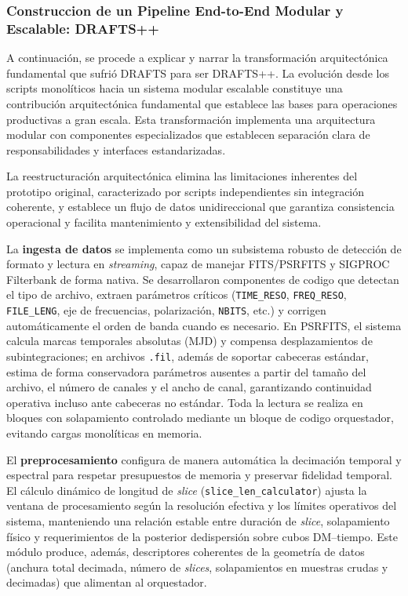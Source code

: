 \subsubsection{Construccion de un Pipeline End-to-End Modular y Escalable: DRAFTS++}

A continuación, se procede a explicar y narrar la transformación arquitectónica fundamental que sufrió DRAFTS para ser DRAFTS++. La evolución desde los scripts monolíticos hacia un sistema modular escalable constituye una contribución arquitectónica fundamental que establece las bases para operaciones productivas a gran escala. Esta transformación implementa una arquitectura modular con componentes especializados que establecen separación clara de responsabilidades y interfaces estandarizadas.

La reestructuración arquitectónica elimina las limitaciones inherentes del prototipo original, caracterizado por scripts independientes sin integración coherente, y establece un flujo de datos unidireccional que garantiza consistencia operacional y facilita mantenimiento y extensibilidad del sistema.

La \textbf{ingesta de datos} se implementa como un subsistema robusto de detección de formato y lectura en \emph{streaming}, capaz de manejar FITS/PSRFITS y SIGPROC Filterbank de forma nativa. Se desarrollaron componentes de codigo que detectan el tipo de archivo, extraen parámetros críticos (\texttt{TIME\_RESO}, \texttt{FREQ\_RESO}, \texttt{FILE\_LENG}, eje de frecuencias, polarización, \texttt{NBITS}, etc.) y corrigen automáticamente el orden de banda cuando es necesario. En PSRFITS, el sistema calcula marcas temporales absolutas (MJD) y compensa desplazamientos de subintegraciones; en archivos \texttt{.fil}, además de soportar cabeceras estándar, estima de forma conservadora parámetros ausentes a partir del tamaño del archivo, el número de canales y el ancho de canal, garantizando continuidad operativa incluso ante cabeceras no estándar. Toda la lectura se realiza en bloques con solapamiento controlado mediante un bloque de codigo orquestador, evitando cargas monolíticas en memoria.

El \textbf{preprocesamiento} configura de manera automática la decimación temporal y espectral para respetar presupuestos de memoria y preservar fidelidad temporal. El cálculo dinámico de longitud de \emph{slice} (\texttt{slice\_len\_calculator}) ajusta la ventana de procesamiento según la resolución efectiva y los límites operativos del sistema, manteniendo una relación estable entre duración de \emph{slice}, solapamiento físico y requerimientos de la posterior dedispersión sobre cubos DM--tiempo. Este módulo produce, además, descriptores coherentes de la geometría de datos (anchura total decimada, número de \emph{slices}, solapamientos en muestras crudas y decimadas) que alimentan al orquestador.

